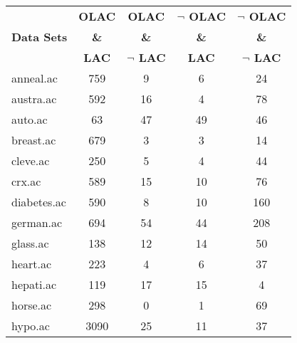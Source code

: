 \begin{table}[htbp]
	\centering
		\begin{tabular}{|l|c|c|c|c|}
		\hline
				& \textbf{OLAC}		& \textbf{OLAC}			& \textbf{$\neg$ OLAC}	& \textbf{$\neg$ OLAC}	\\
		\textbf{Data Sets}	& \textbf{\&}		& \textbf{\&}			& \textbf{\&}			& \textbf{\&}			\\
				& \textbf{LAC}		& \textbf{$\neg$ LAC}		& \textbf{LAC}			& \textbf{$\neg$ LAC}		\\
		\hline
		anneal.ac       & 759           & 9                  & 6                        & 24                            \\
		\hline
		austra.ac       & 592           & 16                 & 4                        & 78                            \\
		\hline
		auto.ac         & 63            & 47                 & 49                       & 46                            \\
		\hline
		breast.ac       & 679           & 3                  & 3                        & 14                            \\
		\hline
		cleve.ac        & 250           & 5                  & 4                        & 44                            \\
		\hline
		crx.ac          & 589           & 15                 & 10                       & 76                            \\
		\hline
		diabetes.ac     & 590           & 8                  & 10                       & 160                           \\
		\hline
		german.ac       & 694           & 54                 & 44                       & 208                           \\
		\hline
		glass.ac        & 138           & 12                 & 14                       & 50                            \\
		\hline
		heart.ac        & 223           & 4                  & 6                        & 37                            \\
		\hline
		hepati.ac       & 119           & 17                 & 15                       & 4                             \\
		\hline
		horse.ac        & 298           & 0                  & 1                        & 69                            \\
		\hline
		hypo.ac         & 3090          & 25                 & 11                       & 37                            \\

\end{tabular}
\end{table}

